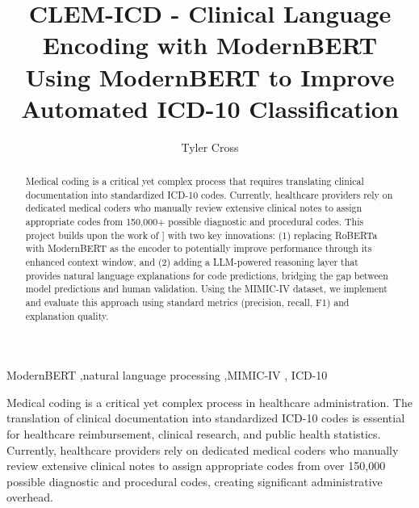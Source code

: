 \documentclass[
  authoryear,
  preprint]{elsarticle}
\begin{document}
\begin{frontmatter}
\title{CLEM-ICD - Clinical Language Encoding with
ModernBERT \\\large{Using ModernBERT to Improve Automated ICD-10
Classification} }
\author[1]{Tyler Cross%
%
}


        
\begin{abstract}
Medical coding is a critical yet complex process that requires
translating clinical documentation into standardized ICD-10 codes.
Currently, healthcare providers rely on dedicated medical coders who
manually review extensive clinical notes to assign appropriate codes
from 150,000+ possible diagnostic and procedural codes. This project
builds upon the work of \citet{edin2024explainable}{]} with two key
innovations: (1) replacing RoBERTa with ModernBERT
\citep{warner2024modernbert} as the encoder to potentially improve
performance through its enhanced context window, and (2) adding a
LLM-powered reasoning layer that provides natural language explanations
for code predictions, bridging the gap between model predictions and
human validation. Using the MIMIC-IV dataset, we implement and evaluate
this approach using standard metrics (precision, recall, F1) and
explanation quality.
\end{abstract}





\begin{keyword}
    ModernBERT \sep natural language processing \sep MIMIC-IV \sep 
    ICD-10
\end{keyword}
\end{frontmatter}
    

Medical coding is a critical yet complex process in healthcare
administration. The translation of clinical documentation into
standardized ICD-10 codes is essential for healthcare reimbursement,
clinical research, and public health statistics. Currently, healthcare
providers rely on dedicated medical coders who manually review extensive
clinical notes to assign appropriate codes from over 150,000 possible
diagnostic and procedural codes, creating significant administrative
overhead.
\end{document}
